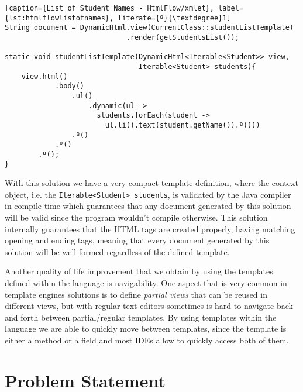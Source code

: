 \bigskip


\begin{minipage}{\linewidth}
\begin{lstlisting}[caption={List of Student Names - HtmlFlow/xmlet}, label={lst:htmlflowlistofnames}, literate={º}{\textdegree}1]
String document = DynamicHtml.view(CurrentClass::studentListTemplate)
                             .render(getStudentsList());
    
static void studentListTemplate(DynamicHtml<Iterable<Student>> view,                                
                                Iterable<Student> students){
    view.html()
            .body()
                .ul()
                    .dynamic(ul -> 
                      students.forEach(student ->                   
                        ul.li().text(student.getName()).º()))
                .º()
            .º()
        .º();
}
\end{lstlisting}
\end{minipage} 

\noindent
With this solution we have a very compact template definition, where the context object, i.e. the \texttt{Iterable<Student> students}, is validated by the Java compiler in compile time which guarantees that any document generated by this solution will be valid since the program wouldn't compile otherwise. This solution internally guarantees that the \ac{HTML} tags are created properly, having matching opening and ending tags, meaning that every document generated by this solution will be well formed regardless of the defined template. 

\noindent
Another quality of life improvement that we obtain by using the templates defined within the language is navigability. One aspect that is very common in template engines solutions is to define \textit{partial views} that can be reused in different views, but with regular text editors sometimes is hard to navigate back and forth between partial/regular templates. By using templates within the language we are able to quickly move between templates, since the template is either a method or a field and most \ac{IDE}s allow to quickly access both of them.

\section{Problem Statement}
\label{sec:problemstatement}

